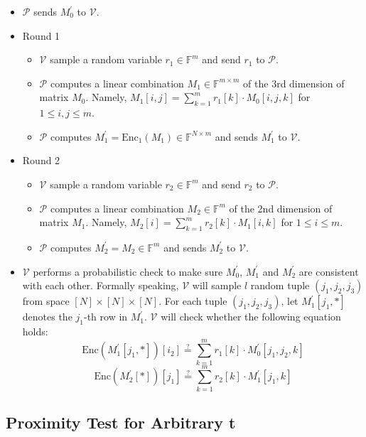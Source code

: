 \begin{itemize}
    \item $\mathcal{P}$ sends $M_0^{\prime}$ to $\mathcal{V}$.
    \item Round 1
    \begin{itemize}
        \item $\mathcal{V}$ sample a random variable $r_1 \in \mathbb{F}^m$ and send $r_1$ to $\mathcal{P}$.
        \item $\mathcal{P}$ computes a linear combination $M_1 \in \mathbb{F}^{m \times m}$ of the 3rd dimension of matrix $M_0$.
        Namely, $M_1[i,j] = \sum_{k=1}^{m} r_1[k] \cdot M_0[i,j,k]$ for $1 \le i, j \le m$.
        \item $\mathcal{P}$ computes $M_1^\prime = \text{Enc}_1(M_1) \in \mathbb{F}^{N \times m}$ and sends $M_1^\prime$ to $\mathcal{V}$.
    \end{itemize}
     
    
    \item Round 2
    \begin{itemize}
        \item $\mathcal{V}$ sample a random variable $r_2 \in \mathbb{F}^m$ and send $r_2$ to $\mathcal{P}$.
        \item $\mathcal{P}$ computes a linear combination $M_2 \in \mathbb{F}^{m}$ of the 2nd dimension of matrix $M_1$.
        Namely, $M_2[i] = \sum_{k=1}^{m} r_2[k] \cdot M_1[i, k]$ for $1 \le i \le m$.
        \item $\mathcal{P}$ computes $M_2^\prime = M_2 \in \mathbb{F}^{m}$ and sends $M_2^\prime$ to $\mathcal{V}$.
    \end{itemize}
    
    \item $\mathcal{V}$ performs a probabilistic check to make sure $M_0^\prime $, $ M_1^\prime$ and $M_2^\prime$ are consistent with each other. Formally speaking, $\mathcal{V}$ will sample $l$ random tuple $(j_1, j_2, j_3)$ from space $[N] \times [N] \times [N]$. 
    For each tuple $(j_1, j_2, j_3)$, let $M_1^\prime[j_1, *]$ denotes the $j_1$-th row in $M_1^\prime$.
    $\mathcal{V}$ will check whether the following equation holds:
$$
    \text{Enc}(M_1^\prime[j_1, *])[i_2] \stackrel{?}{=} \sum_{k=1}^m r_1[k] \cdot M_0^{\prime}[j_1,j_2,k]
$$
$$
    \text{Enc}(M_2^\prime[*])[j_1] \stackrel{?}{=} \sum_{k=1}^m r_2[k] \cdot M_1^{\prime}[j_1,k]
$$
\end{itemize}

\subsection{Proximity Test for Arbitrary t}

